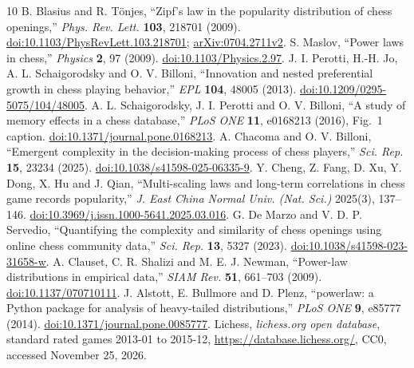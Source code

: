 \documentclass[11pt]{article}
\begin{document}
\begin{thebibliography}{10}
 B. Blasius and R. T\"onjes, ``Zipf's law in the popularity distribution of chess openings,'' \emph{Phys. Rev. Lett.} \textbf{103}, 218701 (2009). \href{https://doi.org/10.1103/PhysRevLett.103.218701}{doi:10.1103/PhysRevLett.103.218701}; \href{https://arxiv.org/abs/0704.2711}{arXiv:0704.2711v2}.
 S. Maslov, ``Power laws in chess,'' \emph{Physics} \textbf{2}, 97 (2009). \href{https://doi.org/10.1103/Physics.2.97}{doi:10.1103/Physics.2.97}.
 J. I. Perotti, H.-H. Jo, A. L. Schaigorodsky and O. V. Billoni, ``Innovation and nested preferential growth in chess playing behavior,'' \emph{EPL} \textbf{104}, 48005 (2013). \href{https://doi.org/10.1209/0295-5075/104/48005}{doi:10.1209/0295-5075/104/48005}.
 A. L. Schaigorodsky, J. I. Perotti and O. V. Billoni, ``A study of memory effects in a chess database,'' \emph{PLoS ONE} \textbf{11}, e0168213 (2016), Fig.~1 caption. \href{https://doi.org/10.1371/journal.pone.0168213}{doi:10.1371/journal.pone.0168213}.
 A. Chacoma and O. V. Billoni, ``Emergent complexity in the decision-making process of chess players,'' \emph{Sci. Rep.} \textbf{15}, 23234 (2025). \href{https://doi.org/10.1038/s41598-025-06335-9}{doi:10.1038/s41598-025-06335-9}.
 Y. Cheng, Z. Fang, D. Xu, Y. Dong, X. Hu and J. Qian, ``Multi-scaling laws and long-term correlations in chess game records popularity,'' \emph{J. East China Normal Univ. (Nat. Sci.)} 2025(3), 137--146. \href{https://doi.org/10.3969/j.issn.1000-5641.2025.03.016}{doi:10.3969/j.issn.1000-5641.2025.03.016}.
 G. De Marzo and V. D. P. Servedio, ``Quantifying the complexity and similarity of chess openings using online chess community data,'' \emph{Sci. Rep.} \textbf{13}, 5327 (2023). \href{https://doi.org/10.1038/s41598-023-31658-w}{doi:10.1038/s41598-023-31658-w}.
 A. Clauset, C. R. Shalizi and M. E. J. Newman, ``Power-law distributions in empirical data,'' \emph{SIAM Rev.} \textbf{51}, 661--703 (2009). \href{https://doi.org/10.1137/070710111}{doi:10.1137/070710111}.
 J. Alstott, E. Bullmore and D. Plenz, ``powerlaw: a Python package for analysis of heavy-tailed distributions,'' \emph{PLoS ONE} \textbf{9}, e85777 (2014). \href{https://doi.org/10.1371/journal.pone.0085777}{doi:10.1371/journal.pone.0085777}.
 Lichess, \emph{lichess.org open database}, standard rated games 2013-01 to 2015-12, \url{https://database.lichess.org/}, CC0, accessed November 25, 2026.
\end{thebibliography}
\end{document}
